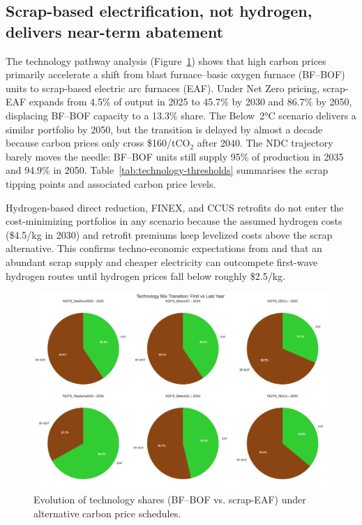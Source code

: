 \documentclass[preprint,1p,authoryear]{elsarticle}
\begin{document}
\subsection{Scrap-based electrification, not hydrogen, delivers near-term abatement}

The technology pathway analysis (Figure~\ref{fig:technology-transition}) shows that high carbon prices primarily accelerate a shift from blast furnace--basic oxygen furnace (BF--BOF) units to scrap-based electric arc furnaces (EAF). Under Net Zero pricing, scrap-EAF expands from 4.5\% of output in 2025 to 45.7\% by 2030 and 86.7\% by 2050, displacing BF--BOF capacity to a 13.3\% share. The Below~2°C scenario delivers a similar portfolio by 2050, but the transition is delayed by almost a decade because carbon prices only cross \$160/tCO$_2$ after 2040. The NDC trajectory barely moves the needle: BF--BOF units still supply 95\% of production in 2035 and 94.9\% in 2050. Table~\ref{tab:technology-thresholds} summarises the scrap tipping points and associated carbon price levels.

Hydrogen-based direct reduction, FINEX, and CCUS retrofits do not enter the cost-minimizing portfolios in any scenario because the assumed hydrogen costs (\$4.5/kg in 2030) and retrofit premiums keep levelized costs above the scrap alternative. This confirms techno-economic expectations from \citet{MaterialEconomics2019} and \citet{demailly2018european} that an abundant scrap supply and cheaper electricity can outcompete first-wave hydrogen routes until hydrogen prices fall below roughly \$2.5/kg.

\begin{figure}[!t]
  \centering
  \includegraphics[width=0.8\linewidth]{technology_transition}
  \caption{Evolution of technology shares (BF--BOF vs. scrap-EAF) under alternative carbon price schedules.}
  \label{fig:technology-transition}
\end{figure}
\end{document}
